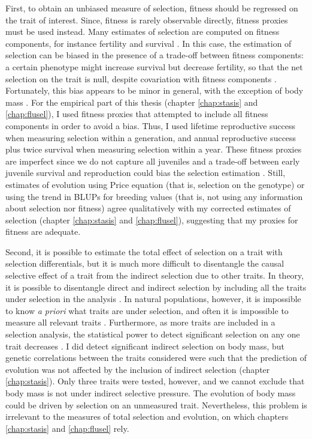 First, to obtain an unbiased measure of selection, fitness should be regressed on the trait of interest. Since, fitness is rarely observable directly, fitness proxies must be used instead. Many estimates of selection are computed on fitness components, for instance fertility and survival \parencite{Kingsolver2012}. In this case, the estimation of selection can be biased in the presence of a trade-off between fitness components: a certain phenotype might increase survival but decrease fertility, so that the net selection on the trait is null, despite covariation with fitness components \parencite{Thompson2011, Kingsolver2012, Brookfield2016}. Fortunately, this bias appears to be minor in general, with the exception of body mass \parencite{Kingsolver2011}.
For the empirical part of this thesis (chapter \ref{chap:stasis} and \ref{chap:flusel}), I used fitness proxies that attempted to include all fitness components in order to avoid a bias. Thus, I used lifetime reproductive success when measuring selection within a generation, and annual reproductive success plus twice survival when measuring selection within a year. These fitness proxies are imperfect since we do not capture all juveniles and a trade-off between early juvenile survival and reproduction could bias the selection estimation \parencite{Hadfield2008}. Still, estimates of evolution using Price equation (that is, selection on the genotype) or using the trend in BLUPs for breeding values (that is, not using any information about selection nor fitness) agree qualitatively with my corrected estimates of selection (chapter \ref{chap:stasis} and \ref{chap:flusel}), suggesting that my proxies for fitness are adequate. 

Second, it is possible to estimate the total effect of selection on a trait with selection differentials, but it is much more difficult to disentangle the causal selective effect of a trait from the indirect selection due to other traits. In theory, it is possible to disentangle direct and indirect selection by including all the traits under selection in the analysis \parencite{Lande1983}. In natural populations, however, it is impossible to know \emph{a priori} what traits are under selection, and often it is impossible to measure all relevant traits \parencite{Brookfield2016, Hadfield2008}. Furthermore, as more traits are included in a selection analysis, the statistical power to detect significant selection on any one trait decreases \parencite{Mitchell-Olds1987}.
I did detect significant indirect selection on body mass, but genetic correlations between the traits considered were such that the prediction of evolution was not affected by the inclusion of indirect selection (chapter \ref{chap:stasis}). Only three traits were tested, however, and we cannot exclude that body mass is not under indirect selective pressure. The evolution of body mass could be driven by selection on an unmeasured trait.
Nevertheless, this problem is irrelevant to the measures of total selection and evolution, on which chapters \ref{chap:stasis} and \ref{chap:flusel} rely.

